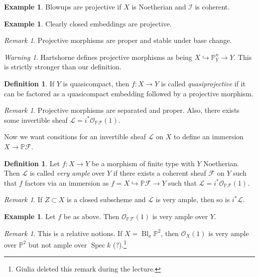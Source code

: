 \documentclass[leqno, openany]{memoir}
\theoremstyle{definition}
\newtheorem{defn}[thm]{Definition}
\newtheorem{exm}[thm]{Example}
\theoremstyle{remark}
\newtheorem{rmk}[thm]{Remark}
\newtheorem{warn}[thm]{Warning}
\theoremstyle{plain}
\theoremstyle{definition}
\theoremstyle{remark}
\renewcommand{\P}{\mathbb{P}}
\newcommand{\mc}[1]{\mathcal{#1}}
\DeclareMathOperator{\Spec}{Spec}
\DeclareMathOperator{\Bl}{Bl}
\begin{document}
\begin{exm} Blowups are projective if $X$ is Noetherian and $\mc{I}$ is
coherent.  \end{exm}

\begin{exm} Clearly closed embeddings are projective.  \end{exm}

\begin{rmk} Projective morphisms are proper and stable under base change.
\end{rmk}

\begin{warn} Hartshorne defines projective morphisms as being $X
\hookrightarrow \P^n_Y \to Y$. This is strictly stronger than our definition.
\end{warn}

\begin{defn} If $Y$ is quasicompact, then $f \colon X \to Y$ is called
\textit{quasiprojective} if it can be factored as a quasicompact embedding
followed by a projective morphism.  \end{defn}

\begin{rmk} Projective morphisms are separated and proper. Also, there exists
some invertible sheaf $\mc{L} = i^* \mc{O}_{\P \mc{F}}(1)$.  \end{rmk}

Now we want consitions for an invertible sheaf $\mc{L}$ on $X$ to define an
immersion $X \to \P \mc{F}$.

\begin{defn} Let $f \colon X \to Y$ be a morphism of finite type with $Y$
    Noetherian. Then $\mc{L}$ is called \textit{very ample} over $Y$ if there
    exists a coherent sheaf $\mc{F}$ on $Y$ such that $f$ factors via an
    immersion as $f = X \hookrightarrow \P \mc{F} \to Y$ such that $\mc{L} =
    i^* \mc{O}_{\P \mc{F}}(1)$.  \end{defn}

\begin{rmk} If $Z \subset X$ is a closed subscheme and $\mc{L}$ is very ample,
then so is $i^* \mc{L}$.  \end{rmk}

\begin{exm} Let $f$ be as above. Then $\mc{O}_{\P \mc{F}}(1)$ is very ample
over $Y$.  \end{exm}

\begin{rmk} This is a relative notions. If $X = \Bl_x \P^2$, then $\mc{O}_X(1)$
is very ample over $\P^2$ but not ample over $\Spec k$ (?).\footnote{Giulia
deleted this remark during the lecture.} \end{rmk}
\end{document}
